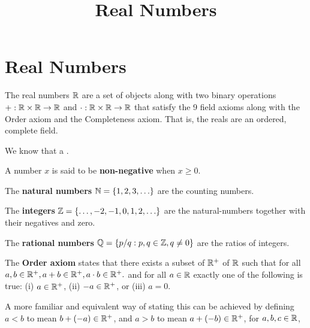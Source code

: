 \documentclass{article}
\title{Real Numbers}
\begin{document}
\section{Real Numbers}

\begin{definition}
The real numbers $\mathbb{R}$ are a set of objects along with two binary operations $+ : \mathbb{R} \times \mathbb{R} \to \mathbb{R}$ and $\cdot : \mathbb{R} \times \mathbb{R} \to \mathbb{R}$ that satisfy the 9 field axioms along with the Order axiom and the Completeness axiom. That is, the reals are an ordered, complete \@{field}.
\end{definition}

We know that a .

\begin{definition}
	A number $x$ is said to be \textbf{non-negative} when $x \geq 0.$
\end{definition}

\begin{definition}
The \textbf{natural numbers} $\naturals = \set{1, 2, 3, \dots}$ are the counting numbers.
\end{definition}

\begin{definition}[Integers]
The \textbf{integers} $\integers = \set{\dots, -2, -1, 0, 1, 2, \dots}$ are the \@{natural-numbers} together with their negatives and zero.
\end{definition}

\begin{definition}
The \textbf{rational numbers} $\mathbb{Q} = \left\{ p/q : p, q \in \mathbb{Z}, q \neq 0 \right\}$ are the ratios of \@{integers}.
\end{definition}

The \textbf{Order axiom} states that there exists a \@{subset} of $\mathbb{R}^+$ of $\mathbb{R}$ such that for all $a, b \in \mathbb{R}^+,a + b \in \mathbb{R}^+, a \cdot b \in \mathbb{R}^+.$ and for all $a \in \mathbb{R}$ exactly one of the following is true: (i) $a \in \mathbb{R}^+$, (ii) $-a \in \mathbb{R}^+$, or (iii) $a = 0$.

A more familiar and equivalent way of stating this can be achieved by defining $a < b$ to mean $b + (-a) \in \mathbb{R}^+$, and $a > b$ to mean $a + (-b) \in \mathbb{R}^+$, for $a, b, c \in \mathbb{R}$,
\end{document}
